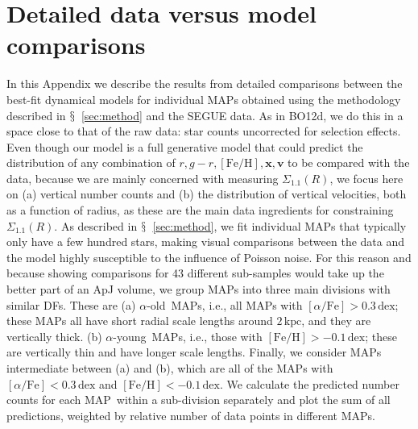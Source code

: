 \documentclass{emulateapj}
\newcommand{\ie}{i.e.}
\newcommand{\sectionname}{$\mathsection$}
\newcommand{\apoor}{\ensuremath{\alpha}-young}
\newcommand{\aenhanced}{\ensuremath{\alpha}-old}
\newcommand{\feh}{\ensuremath{[\mathrm{Fe/H}]}}
\newcommand{\afe}{\ensuremath{[\alpha\mathrm{/Fe}]}}
\renewcommand{\vec}[1]{\ensuremath{\mathbf{#1}}}
\newcommand{\vecx}{\ensuremath{\vec{x}}}
\newcommand{\vecv}{\ensuremath{\vec{v}}}
\newcommand{\map}{MAP}
\newcommand{\dex}{\ensuremath{\,\mathrm{dex}}}
\newcommand{\kpc}{\ensuremath{\,\mathrm{kpc}}}
\newcommand{\sigoneone}{\ensuremath{\Sigma_{1.1}}}
\newcommand{\bo}{BO12}
\begin{document}
\section{Detailed data versus model comparisons}\label{sec:datamodel}

In this Appendix we describe the results from detailed comparisons
between the best-fit dynamical models for individual \map s obtained
using the methodology described in \sectionname~\ref{sec:method} and
the SEGUE data. As in \bo d, we do this in a space close to that of
the raw data: star counts uncorrected for selection effects. Even
though our model is a full generative model that could predict the
distribution of any combination of $r,g-r,\feh,\vecx,\vecv$ to be
compared with the data, because we are mainly concerned with measuring
$\sigoneone(R)$, we focus here on (a) vertical number counts and (b)
the distribution of vertical velocities, both as a function of radius,
as these are the main data ingredients for constraining
$\sigoneone(R)$. As described in \sectionname~\ref{sec:method}, we fit
individual \map s that typically only have a few hundred stars, making
visual comparisons between the data and the model highly susceptible
to the influence of Poisson noise. For this reason and because showing
comparisons for 43 different sub-samples would take up the better part
of an ApJ volume, we group \map s into three main divisions with
similar DFs. These are (a) \aenhanced\ \map s, \ie, all \map s with
$\afe > 0.3\dex$; these \map s all have short radial scale lengths
around $2\kpc$, and they are vertically thick. (b) \apoor\ \map s,
\ie, those with $\feh > -0.1\dex$; these are vertically thin and have
longer scale lengths. Finally, we consider \map s intermediate between
(a) and (b), which are all of the \map s with $\afe < 0.3\dex$ and
$\feh < -0.1\dex$. We calculate the predicted number counts for each
\map\ within a sub-division separately and plot the sum of all
predictions, weighted by relative number of data points in different
\map s.
\end{document}
